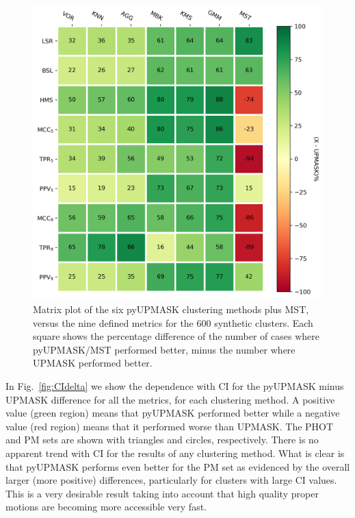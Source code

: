 \documentclass{aa}
\begin{document}
 \begin{figure}
 \includegraphics[width=\hsize]{figs/matrix.png}
 \caption{Matrix plot of the six pyUPMASK clustering methods plus MST, versus
 the nine defined metrics for the 600 synthetic clusters. Each square shows
 the percentage difference of the number of cases where pyUPMASK/MST performed
 better, minus the number where UPMASK performed better.}
 \label{fig:matrix}
 \end{figure}

 In Fig.~\ref{fig:CIdelta} we show the dependence with CI for the pyUPMASK
 minus UPMASK difference for all the metrics, for each clustering method. A
 positive value (green region) means that pyUPMASK performed better while a
 negative value (red region) means that it performed worse than UPMASK. The
 PHOT and PM sets are shown with triangles and circles, respectively.
 There is no apparent trend with CI for the results of any clustering method.
 What is clear is that pyUPMASK performs even better for the PM set as
 evidenced by the overall larger (more positive) differences, particularly for
 clusters with large CI values. This is a very desirable result taking into
 account that high quality proper motions are becoming more accessible very
 fast.\\
\end{document}
